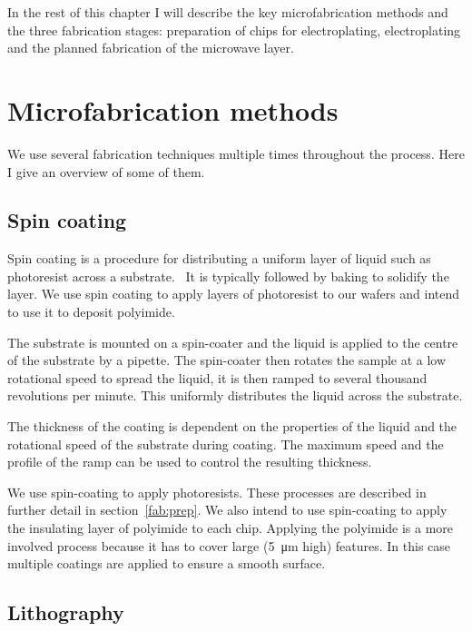 In the rest of this chapter I will describe the key microfabrication methods
and the three fabrication stages: preparation of chips for electroplating,
electroplating and the planned fabrication of the microwave layer.

\section{Microfabrication methods}

We use several fabrication techniques multiple times throughout the process.
Here I give an overview of some of them.

\subsection{Spin coating}
\label{fab:spin}

Spin coating is a procedure for distributing a uniform layer of liquid such as
photoresist  across a substrate.~\cite{Cohen2011} It is typically followed by
baking to solidify the layer. We use spin coating to apply layers of
photoresist to our wafers and intend to use it to deposit polyimide.

The substrate is mounted on a spin-coater
%
%
and the liquid is applied to the centre of the substrate by a pipette. The
spin-coater then rotates the sample at a low rotational speed to spread the
liquid, it is then ramped to several thousand revolutions per minute.
This uniformly distributes the liquid across the substrate.

The thickness of the coating is dependent on the properties of the liquid
 and the rotational speed of the substrate during coating.
The maximum speed and the profile of the ramp can be used to control the
resulting thickness.

We use spin-coating to apply photoresists. These processes are described in
further detail in section~\ref{fab:prep}. We also intend to use spin-coating
to apply the insulating layer of polyimide to each chip. Applying the
polyimide is a more involved process because it has to cover large
(\SI{5}{\micro\meter} high) features. In this case multiple coatings are
applied to ensure a smooth surface. 

\subsection{Lithography}

